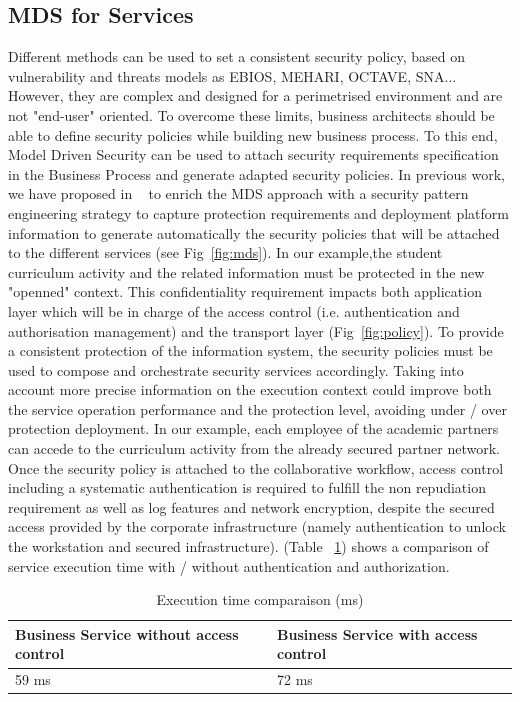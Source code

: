 \documentclass[runningheads,a4paper]{llncs}
\begin{document}
\subsection{MDS for Services}

Different methods can be used to set a consistent security policy, based on vulnerability and threats models as EBIOS, MEHARI, OCTAVE, SNA... However, they are complex and designed for a perimetrised environment and are not "end-user" oriented. To overcome these limits, business architects should be able to define security policies while building new business process. To this end, Model Driven Security can be used to attach security requirements specification in the Business Process and generate adapted security policies. In previous work, we have proposed in ~\cite{OBG12} to enrich the MDS approach with a security pattern engineering strategy to capture protection requirements and deployment platform information to generate automatically the security policies that will be attached to the different services (see Fig~\ref{fig:mds}).
In our example,the student curriculum activity and the related information must be protected in the new "openned" context. This confidentiality requirement impacts both application layer which will be in charge of the access control (i.e. authentication and authorisation management) and the transport layer (Fig~\ref{fig:policy}). 
To provide a consistent protection of the information system, the security policies must be used to compose and orchestrate security services accordingly. Taking into account more precise information on the execution context could improve both the service operation performance and the protection level, avoiding under / over protection deployment. In our example, each employee of the academic partners can accede to the curriculum activity from the already secured partner network. Once the security policy is attached to the collaborative workflow, access control including a systematic authentication is required to fulfill the non repudiation requirement as well as log features and network encryption, despite the secured access provided by the corporate infrastructure (namely authentication to unlock the workstation and secured infrastructure). (Table ~\ref{tab:tab1}) shows a comparison of service execution time with / without authentication and authorization.
\begin{table}
\caption{Execution time comparaison (ms)}
\begin{tabular}{|l|l| }
\hline
Business Service without access control & Business Service with access control \\
  \hline
 59 ms & 72 ms\\
    \hline
\end{tabular}
\label{tab:tab1}
\end{table}
\end{document}
